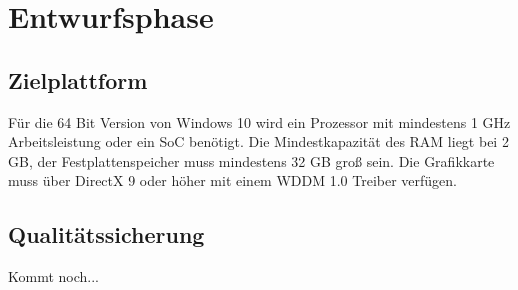\section{Entwurfsphase}
\label{sec:Entwurfsphase}

\subsection{Zielplattform}
\label{sec:Zielplattform}
Für die 64 Bit Version von Windows 10 wird ein Prozessor mit mindestens 1 GHz Arbeitsleistung oder ein {\acs{SoC}} benötigt. Die Mindestkapazität des RAM liegt bei 2 GB, der Festplattenspeicher muss mindestens 32 GB groß sein. Die Grafikkarte muss über DirectX 9 oder höher mit einem {\acs{WDDM}} 1.0 Treiber verfügen.

\subsection{Qualitätssicherung}
\label{sec:Qualitätssicherung}
Kommt noch...